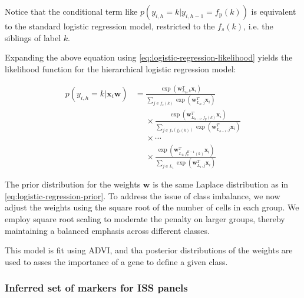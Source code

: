 Notice that the conditional term like $p(y_{i,h} = k | y_{i,h-1} = f_{\text{p}}(k))$ is equivalent to the standard logistic regression model, restricted to the $f_s(k)$, i.e. the siblings of label $k$. 

Expanding the above equation using \cref{eq:logistic-regression-likelihood} yields the likelihood function for the hierarchical logistic regression model:

\begin{equation}
    \begin{aligned}
    p(y_{i,h} = k | \mathbf{x}_{i} \mathbf{w}) &= 
         \frac{\exp(\mathbf{w}_{L_h, k}^T \mathbf{x}_i)}{\sum_{j \in f_s(k)} \exp(\mathbf{w}_{L_h, j}^T \mathbf{x}_i)} \\
        &\phantom{=} \times \frac{\exp(\mathbf{w}_{L_{h-1}, f_p(k)}^T \mathbf{x}_i)}{\sum_{j \in  f_s(f_p(k))} \exp(\mathbf{w}_{L_{h-1}, j}^T \mathbf{x}_i)} \\
        &\phantom{=} \times \cdots \\
        &\phantom{=} \times \frac{\exp(\mathbf{w}_{L_1, f_p^{H-1}(k)}^T \mathbf{x}_i)}{\sum_{j \in L_1} \exp(\mathbf{w}_{L_1, j}^T \mathbf{x}_i)}
    \end{aligned}
\end{equation}

The prior distribution for the weights $\mathbf{w}$ is the same Laplace distribution as in \cref{eq:logistic-regression-prior}. To address the issue of class imbalance, we now adjust the weights using the square root of the number of cells in each group. We employ square root scaling to moderate the penalty on larger groups, thereby maintaining a balanced emphasis across different classes.

This model is fit using \ac{ADVI}, and tha posterior distributions of the weights are used to asses the importance of a gene to define a given class. 


\subsubsection*{Inferred set of markers for \ac{ISS} panels}

